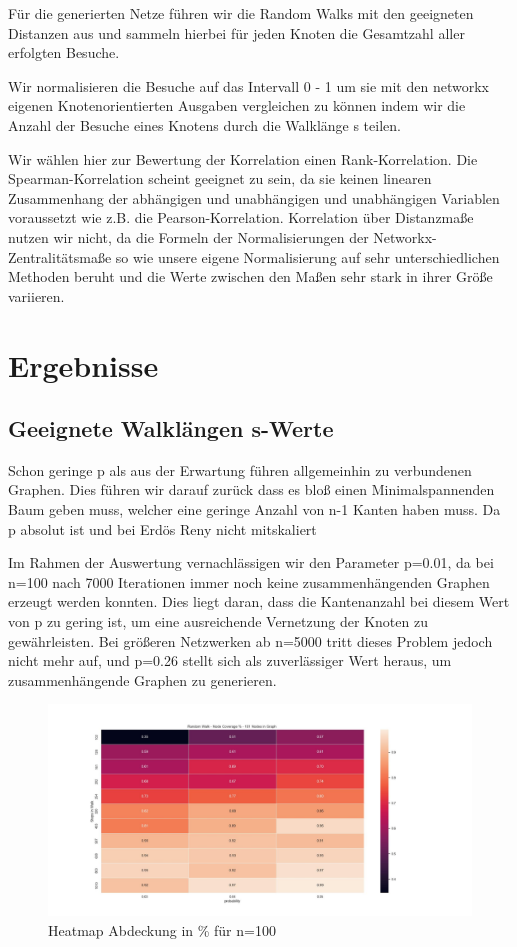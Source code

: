 Für die generierten Netze führen wir die Random Walks mit den geeigneten Distanzen aus und sammeln hierbei für jeden Knoten die Gesamtzahl aller erfolgten Besuche.

Wir normalisieren die Besuche auf das Intervall 0 - 1 um sie mit den networkx eigenen Knotenorientierten Ausgaben vergleichen zu können indem wir die Anzahl der Besuche eines Knotens durch die Walklänge s teilen. 


Wir wählen hier zur Bewertung der Korrelation einen Rank-Korrelation. Die Spearman-Korrelation scheint geeignet zu sein, da sie keinen linearen Zusammenhang der abhängigen und unabhängigen und unabhängigen Variablen voraussetzt wie z.B. die Pearson-Korrelation. Korrelation über Distanzmaße nutzen wir nicht, da die Formeln der Normalisierungen der Networkx-Zentralitätsmaße so wie unsere eigene Normalisierung auf sehr unterschiedlichen Methoden beruht und die Werte zwischen den Maßen sehr stark in ihrer Größe variieren.



\section{Ergebnisse}

\subsection{Geeignete Walklängen s-Werte}

Schon geringe p als aus der Erwartung führen allgemeinhin zu verbundenen Graphen.
Dies führen wir darauf zurück dass es bloß einen Minimalspannenden Baum geben muss, welcher eine geringe Anzahl von n-1 Kanten haben muss. Da p absolut ist und bei Erdös Reny nicht mitskaliert

Im Rahmen der Auswertung vernachlässigen wir den Parameter p=0.01, da bei n=100 nach 7000 Iterationen immer noch keine zusammenhängenden Graphen erzeugt werden konnten. Dies liegt daran, dass die Kantenanzahl bei diesem Wert von p zu gering ist, um eine ausreichende Vernetzung der Knoten zu gewährleisten. Bei größeren Netzwerken ab n=5000 tritt dieses Problem jedoch nicht mehr auf, und p=0.26 stellt sich als zuverlässiger Wert heraus, um zusammenhängende Graphen zu generieren. 

 \begin{figure}
    \centering
    \includegraphics[width=\textwidth]{template/chapters/heatmap_lengths_unconnected_101.jpg}
    \caption{Heatmap Abdeckung in \% für n=100}
    \label{fig:cov100}
\end{figure}

